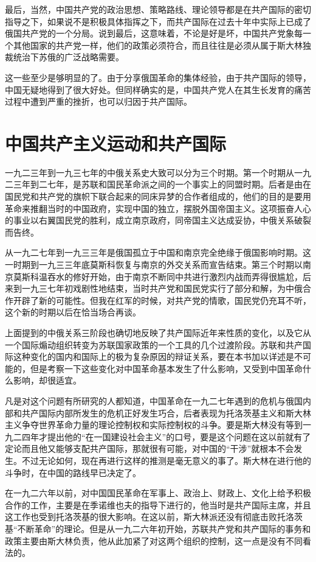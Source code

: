 \documentclass[10pt]{book}
\begin{document}
最后，当然，中国共产党的政治思想、策略路线、理论领导都是在共产国际的密切指导之下，如果说不是积极具体指挥之下，而共产国际在过去十年中实际上已成了俄国共产党的一个分局。说到最后，这意味着，不论是好是坏，中国共产党象每一个其他国家的共产党一样，他们的政策必须符合，而且往往是必须从属于斯大林独裁统治下苏俄的广泛战略需要。

这一些至少是够明显的了。由于分享俄国革命的集体经验，由于共产国际的领导，中国无疑地得到了很大好处。但同样确实的是，中国共产党人在其生长发育的痛苦过程中遭到严重的挫折，也可以归因于共产国际。



\section{中国共产主义运动和共产国际}

一九二三年到一九三七年的中俄关系史大致可以分为三个时期。第一个时期从一九二三年到二七年，是苏联和国民革命派之间的一个事实上的同盟时期。后者是由在国民党和共产党的旗帜下联合起来的同床异梦的合作者组成的，他们的目的是要用革命来推翻当时的中国政府，实现中国的独立，摆脱外国帝国主义。这项振奋人心的事业以右翼国民党的胜利，成立南京政府，同帝国主义达成妥协，中俄关系破裂而告终。

从一九二七年到一九三三年是俄国孤立于中国和南京完全绝缘于俄国影响时期。这一时期到一九三三年底莫斯科恢复与南京的外交关系而宣告结束。第三个时期以南京莫斯科温吞水的修好开始，由于南京不断同中共进行激烈内战而弄得很尴尬，后来到一九三七年初戏剧性地结束，当时共产党和国民党实行了部分和解，为中俄合作开辟了新的可能性。但我在红军的时候，对共产党的情歌，国民党仍充耳不听，这个新的时期以后在恰当场合再谈。

上面提到的中俄关系三阶段也确切地反映了共产国际近年来性质的变化，以及它从一个国际煽动组织转变为苏联国家政策的一个工具的几个过渡阶段。苏联和共产国际这种变化的国内和国际上的极为复杂原因的辩证关系，要在本书加以详述是不可能的，但是考察一下这些变化对中国革命基本发生了什么影响，又受到中国革命什么影响，却很适宜。

凡是对这个问题有所研究的人都知道，中国革命在一九二七年遇到的危机与俄国内部和共产国际内部所发生的危机正好发生巧合，后者表现为托洛茨基主义和斯大林主义争夺世界革命力量的理论控制权和实际控制权的斗争。要是斯大林没有等到一九二四年才提出他的“在一国建设社会主义”的口号，要是这个问题在这以前就有了定论而且他又能够支配共产国际，那就很有可能，对中国的“干涉”就根本不会发生。不过无论如何，现在再进行这样的推测是毫无意义的事了。斯大林在进行他的斗争时，在中国的路线早已决定了。

在一九二六年以前，对中国国民革命在军事上、政治上、财政上、文化上给予积极合作的工作，主要是在季诺维也夫的指导下进行的，他当时是共产国际主席，并且这工作也受到托洛茨基的很大影响。在这以前，斯大林派还没有彻底击败托洛茨基“不断革命”的理论。但是从一九二六年初开始，苏联共产党和共产国际的事务和政策主要由斯大林负责，他从此加紧了对这两个组织的控制，这一点是没有不同看法的。
\end{document}
